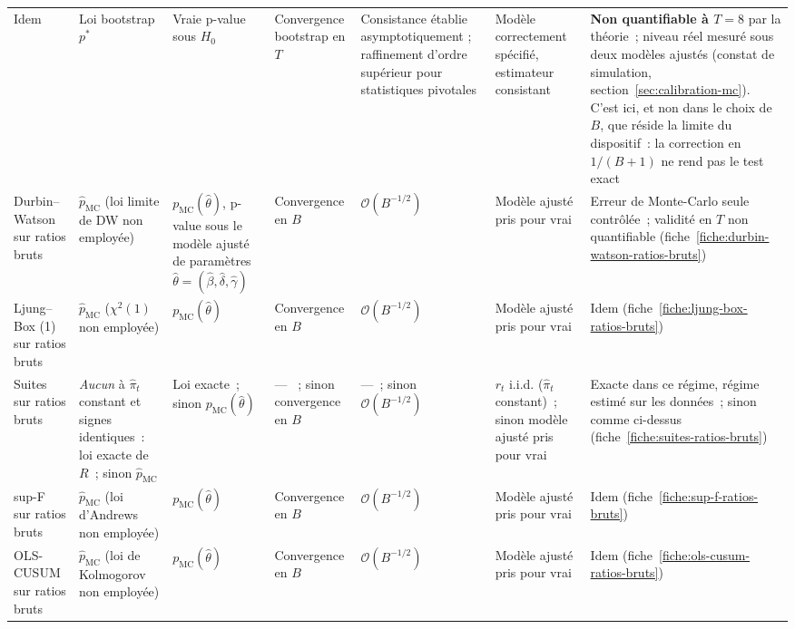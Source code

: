 \documentclass[a4paper,11pt]{article}
\begin{document}
\begin{landscape}
\begin{center}
\begin{longtable}{@{}p{2.7cm}p{3.4cm}p{2.6cm}p{2.5cm}p{3.5cm}p{3.0cm}p{3.6cm}@{}}
Idem & Loi bootstrap $p^{*}$ & Vraie p-value sous $H_0$ &
Convergence bootstrap en $T$ & Consistance établie asymptotiquement ;
raffinement d'ordre supérieur pour statistiques pivotales &
Modèle correctement spécifié, estimateur consistant &
\textbf{Non quantifiable à $T=8$} par la théorie~; niveau réel mesuré sous deux modèles
ajustés (constat de simulation, section~\ref{sec:calibration-mc}). C'est ici, et non dans le choix de $B$, que
réside la limite du dispositif~: la correction en $1/(B+1)$ ne rend pas le test exact \\

Durbin--Watson sur ratios bruts & $\hat p_{\text{MC}}$ (loi limite de DW non employée) &
$p_{\text{MC}}(\hat\theta)$, p-value sous le modèle ajusté de paramètres
$\hat\theta = (\hat\beta, \hat\delta, \hat\gamma)$ & Convergence en $B$ & $\mathcal{O}(B^{-1/2})$ &
Modèle ajusté pris pour vrai &
Erreur de Monte-Carlo seule contrôlée~; validité en $T$ non quantifiable
(fiche~\ref{fiche:durbin-watson-ratios-bruts}) \\

Ljung--Box (1) sur ratios bruts & $\hat p_{\text{MC}}$ ($\chi^2(1)$ non employée) &
$p_{\text{MC}}(\hat\theta)$ & Convergence en $B$ & $\mathcal{O}(B^{-1/2})$ &
Modèle ajusté pris pour vrai & Idem (fiche~\ref{fiche:ljung-box-ratios-bruts}) \\

Suites sur ratios bruts & \emph{Aucun} à $\hat\pi_t$ constant et signes identiques~: loi
exacte de $R$~; sinon $\hat p_{\text{MC}}$ & Loi exacte~; sinon $p_{\text{MC}}(\hat\theta)$ &
--- ~; sinon convergence en $B$ & ---~; sinon $\mathcal{O}(B^{-1/2})$ &
$r_t$ i.i.d. ($\hat\pi_t$ constant)~; sinon modèle ajusté pris pour vrai &
Exacte dans ce régime, régime estimé sur les données~; sinon comme ci-dessus
(fiche~\ref{fiche:suites-ratios-bruts}) \\

sup-F sur ratios bruts & $\hat p_{\text{MC}}$ (loi d'Andrews non employée) &
$p_{\text{MC}}(\hat\theta)$ & Convergence en $B$ & $\mathcal{O}(B^{-1/2})$ &
Modèle ajusté pris pour vrai & Idem (fiche~\ref{fiche:sup-f-ratios-bruts}) \\

OLS-CUSUM sur ratios bruts & $\hat p_{\text{MC}}$ (loi de Kolmogorov non employée) &
$p_{\text{MC}}(\hat\theta)$ & Convergence en $B$ & $\mathcal{O}(B^{-1/2})$ &
Modèle ajusté pris pour vrai & Idem (fiche~\ref{fiche:ols-cusum-ratios-bruts}) \\


\end{longtable}
\end{center}
\end{landscape}
\end{document}
